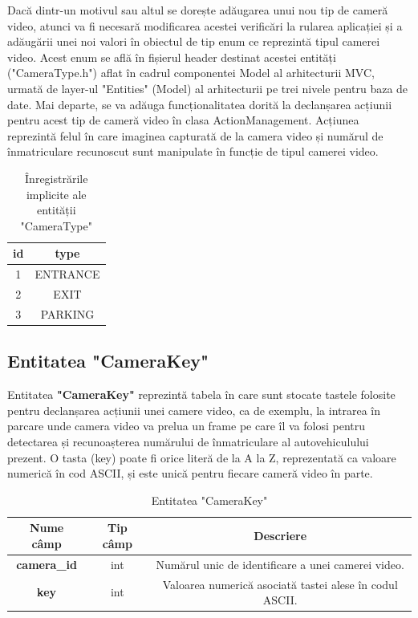 \documentclass[12pt]{article}
\begin{document}
Dac\u{a} dintr-un motivul sau altul se dorește ad\u{a}ugarea unui nou tip de camer\u{a} video, atunci va fi necesar\u{a} modificarea acestei verific\u{a}ri la rularea aplicației și a ad\u{a}ug\u{a}rii unei noi valori \^{i}n obiectul de tip enum ce reprezint\u{a} tipul camerei video. Acest enum se afl\u{a} \^{i}n fișierul header destinat acestei entit\u{a}ți ("CameraType.h") aflat \^{i}n cadrul componentei Model al arhitecturii MVC, urmat\u{a} de layer-ul "Entities" (Model) al arhitecturii pe trei nivele pentru baza de date. Mai departe, se va ad\u{a}uga funcționalitatea dorit\u{a} la declanșarea acțiunii pentru acest tip de camer\u{a} video \^{i}n clasa ActionManagement. Acțiunea reprezint\u{a} felul \^{i}n care imaginea capturat\u{a} de la camera video și num\u{a}rul de \^{i}nmatriculare recunoscut sunt manipulate \^{i}n funcție de tipul camerei video. 

\begin{table}[h]
\centering
\begin{tabular}{|c|c|}
\hline
\textbf{id}  & \textbf{type} \\
\hline
1 & ENTRANCE  \\
\hline
2 & EXIT \\
\hline
3 & PARKING \\
\hline
\end{tabular}
\caption{\^{I}nregistr\u{a}rile implicite ale entit\u{a}ții "CameraType"}
\end{table}

\subsection{Entitatea "CameraKey"}

Entitatea \textbf{"CameraKey"} reprezint\u{a} tabela \^{i}n care sunt stocate tastele folosite pentru declanșarea acțiunii unei camere video, ca de exemplu, la intrarea \^{i}n parcare unde camera video va prelua un frame pe care \^{i}l va folosi pentru detectarea și recunoașterea num\u{a}rului de \^{i}nmatriculare al autovehiculului prezent. O tasta (key) poate fi orice liter\u{a} de la A la Z, reprezentat\u{a} ca valoare numeric\u{a} \^{i}n cod ASCII, și este unic\u{a} pentru fiecare camer\u{a} video \^{i}n parte.

\begin{table}[h]
\centering
\begin{tabular}{|c|c|c|}
\hline
\textbf{Nume c\^{a}mp}  & \textbf{Tip c\^{a}mp} & \textbf{Descriere} \\
\hline
\textbf{camera\_id} & int & Num\u{a}rul unic de identificare a unei camerei video.  \\
\hline
\textbf{key} & int & Valoarea numeric\u{a} asociat\u{a} tastei alese \^{i}n codul ASCII.  \\
\hline
\end{tabular}
\caption{Entitatea "CameraKey"}
\end{table}
\end{document}
